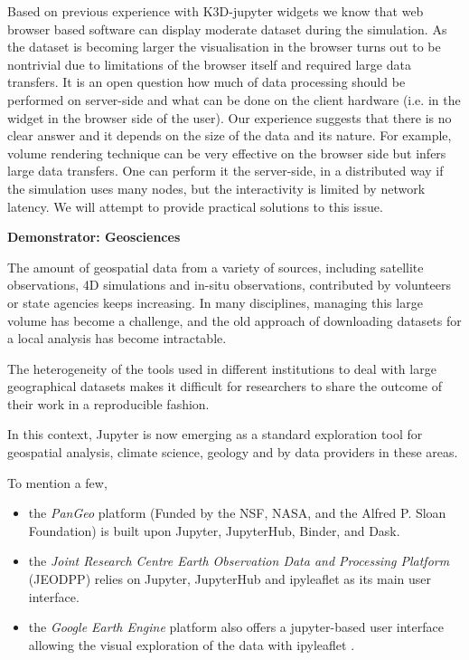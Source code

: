 Based on previous experience with K3D-jupyter\cite{K3D}
widgets we know that web browser based software can display moderate
dataset during the simulation. As the dataset is becoming larger the
visualisation in the browser turns out to be nontrivial due to
limitations of the browser itself and required large data transfers. It is
an open question how much of data processing should be performed on
server-side and what can be done on the client hardware (i.e. in the
widget in the browser side of the user). Our
experience suggests that there is no clear answer and it depends on
the size of the data and its nature. For example, volume rendering
technique can be very effective on the browser side but infers large data
transfers. One can perform it the server-side, in a distributed way if
the simulation uses many nodes, but the interactivity is limited by
network latency. We will attempt to provide practical
solutions to this issue.
%

\medskip
\textbf{Demonstrator: Geosciences}

The amount of geospatial data from a variety of sources, including satellite observations, 4D simulations and in-situ observations, contributed by volunteers
or state agencies keeps increasing. In many disciplines, managing this large volume
has become a challenge, and the old approach of downloading datasets for a local
analysis has become intractable.

The heterogeneity of the tools used in different institutions to deal with
large geographical datasets makes it difficult for researchers to share the outcome
of their work in a reproducible fashion.

In this context, Jupyter is now emerging as a standard exploration tool for
geospatial analysis, climate science, geology and by data providers in these areas.

To mention a few,

\begin{itemize}
\item
   the \emph{PanGeo} platform \cite{Pangeo2018} (Funded by the NSF, NASA, and the
   Alfred P. Sloan Foundation) is built upon Jupyter, JupyterHub, Binder, and Dask.
\item
   the \emph{Joint Research Centre Earth Observation Data and Processing Platform}
   (JEODPP) \cite{Soille2018} relies on Jupyter, JupyterHub and ipyleaflet as
   its main user interface.
\item
   the \emph{Google Earth Engine} platform also offers a jupyter-based user
   interface allowing the visual exploration of the data with ipyleaflet
   \cite{GEEJupyterLeaflet2017}.
\end{itemize}

